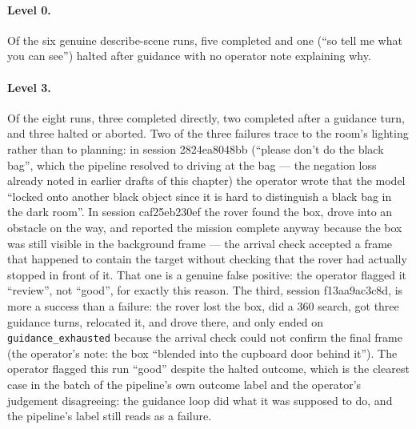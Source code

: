 \paragraph{Level 0.} Of the six genuine describe-scene runs, five completed and one (``so tell me what you can
see'') halted after guidance with no operator note explaining why. 

\paragraph{Level 3.} Of the eight runs, three completed directly, two completed after a guidance turn, and three
halted or aborted. Two of the three failures trace to the room's lighting rather than to planning: in session
2824ea8048bb (``please don't do the black bag'', which the pipeline resolved to driving at the bag — the negation
loss already noted in earlier drafts of this chapter) the operator wrote that the model ``locked onto another black
object since it is hard to distinguish a black bag in the dark room''. In session caf25eb230ef the rover found the
box, drove into an obstacle on the way, and reported the mission complete anyway because the box was still visible
in the background frame — the arrival check accepted a frame that happened to contain the target without checking
that the rover had actually stopped in front of it. That one is a genuine false positive: the operator flagged it
``review'', not ``good'', for exactly this reason. The third, session f13aa9ac3c8d, is more a success than a
failure: the rover lost the box, did a 360\textdegree{} search, got three guidance turns, relocated it, and drove
there, and only ended on \texttt{guidance\_exhausted} because the arrival check could not confirm the final frame
(the operator's note: the box ``blended into the cupboard door behind it''). The operator flagged this run ``good''
despite the halted outcome, which is the clearest case in the batch of the pipeline's own outcome label and the
operator's judgement disagreeing: the guidance loop did what it was supposed to do, and the pipeline's label still
reads as a failure.


